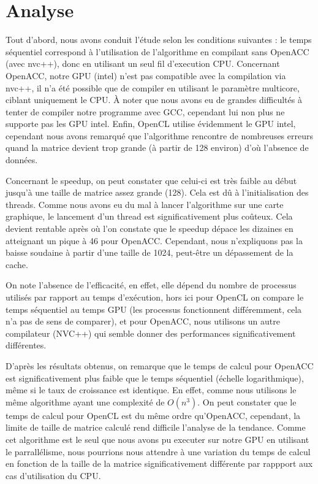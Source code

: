 \documentclass[a4paper, french]{article}
\begin{document}
\section{Analyse}

Tout d'abord, nous avons conduit l'étude selon les conditions suivantes : le temps séquentiel correspond à l'utilisation de l'algorithme en compilant sans OpenACC (avec nvc++), donc en utilisant un seul fil d'execution CPU. Concernant OpenACC, notre GPU (intel) n'est pas compatible avec la compilation via nvc++, il n'a été possible que de compiler en utilisant le paramètre multicore, ciblant uniquement le CPU. À noter que nous avons eu de grandes difficultés à tenter de compiler notre programme avec GCC, cependant lui non plus ne supporte pas les GPU intel. Enfin, OpenCL utilise évidemment le GPU intel, cependant nous avons remarqué que l'algorithme rencontre de nombreuses erreurs quand la matrice devient trop grande (à partir de 128 environ) d'où l'absence de données.

Concernant le speedup, on peut constater que celui-ci est très faible au début jusqu'à une taille de matrice assez grande (128). Cela est dû à l'initialisation des threads. Comme nous avons eu du mal à lancer l'algorithme sur une carte graphique, le lancement d'un thread est significativement plus coûteux. Cela devient rentable après où l'on constate que le speedup dépace les dizaines en atteignant un pique à 46 pour OpenACC. Cependant, nous n'expliquons pas la baisse soudaine à partir d'une taille de 1024, peut-être un dépassement de la cache.

On note l'absence de l'efficacité, en effet, elle dépend du nombre de processus utilisés par rapport au temps d'exécution, hors ici pour OpenCL on compare le temps séquentiel au temps GPU (les processus fonctionnent différemment, cela n'a pas de sens de comparer), et pour OpenACC, nous utilisons un autre compilateur (NVC++) qui semble donner des performances significativement différentes.

D'après les résultats obtenus, on remarque que le temps de calcul pour OpenACC est significativement plus faible que le temps séquentiel (échelle logarithmique), même si le taux de croissance est identique. En effet, comme nous utilisons le même algorithme ayant une complexité de $O(n^3)$. On peut constater que le temps de calcul pour OpenCL est du même ordre qu'OpenACC, cependant, la limite de taille de matrice calculé rend difficile l'analyse de la tendance. Comme cet algorithme est le seul que nous avons
pu executer sur notre GPU en utilisant le parrallélisme, nous pourrions nous attendre à une
variation du temps de calcul en fonction de la taille de la matrice significativement différente par rappport aux cas d’utilisation du CPU.
\end{document}
